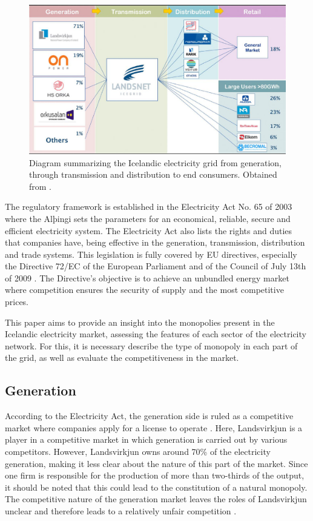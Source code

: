 \documentclass[svn, final]{rureport}
\begin{document}
\begin{figure}[h!]
    \centering
    \includegraphics[width=\linewidth]{electricity_grid.jpg}
    \caption{Diagram summarizing the Icelandic electricity grid from generation, through transmission and distribution to end consumers. Obtained from \cite{our_energy_2016}.}
    \label{fig:N-1}
\end{figure}

The regulatory framework is established in the Electricity Act No. 65 of 2003 \cite{electricity_act_2003} where the Alþingi sets the parameters for an economical, reliable, secure and efficient electricity system. The Electricity Act also lists the rights and duties that companies have, being effective in the generation, transmission, distribution and trade systems. This legislation is fully covered by EU directives, especially the Directive 72/EC of the European Parliament and of the Council of July 13th of 2009 \cite{eu_parliament_2009}. The Directive’s objective is to achieve an unbundled energy market where competition ensures the security of supply and the most competitive prices. 

This paper aims to provide an insight into the monopolies present in the Icelandic electricity market, assessing the features of each sector of the electricity network. For this, it is necessary describe the type of monopoly in each part of the grid, as well as evaluate the competitiveness in the market. 

\subsection{Generation}

According to the Electricity Act, the generation side is ruled as a competitive market where companies apply for a license to operate \cite{electricity_act_2003}. Here, Landsvirkjun is a player in a competitive market \cite{copen_econ_energy_2017} in which generation is carried out by various competitors. However, Landsvirkjun owns around 70\% of the electricity generation, making it less clear about the nature of this part of the market. Since one firm is responsible for the production of more than two-thirds of the output, it should be noted that this could lead to the constitution of a natural monopoly. The competitive nature of the generation market leaves the roles of Landsvirkjun unclear and therefore leads to a relatively unfair competition \cite{copen_econ_energy_2017}.
\end{document}
